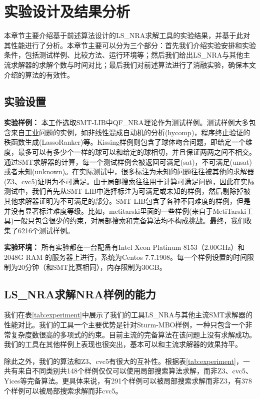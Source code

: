 \chapter{实验设计及结果分析}\label{chap:Result}

本章节主要介绍基于前述算法设计的LS\_NRA求解工具的实验结果，并基于此对其性能进行了分析。本章节主要可以分为三个部分：首先我们介绍实验安排和实验条件，包括测试样例、比较方法、运行环境等；然后我们给出LS\_NRA与其他主流求解器的求解个数与时间对比；最后我们对前述算法进行了消融实验，确保本文介绍的算法的有效性。

\section{实验设置}
\textbf{实验样例：} 本工作选取SMT-LIB中QF\_NRA理论作为测试样例。测试样例大多包含来自工业问题的实例，如非线性混成自动机的分析(hycomp)，程序终止验证的秩函数生成(LassoRanker)等。Kissing样例则包含了球体吻合问题，即给定一个维度，最多可以有多少个一样的球可以和给定的球相切，并且保证两两之间不相交。通过SMT求解器的计算，每一个测试样例会被返回可满足(sat)，不可满足(unsat)或者未知(unknown)。在实际测试中，很多标注为未知的问题往往被其他的求解器(Z3、cvc5)证明为不可满足。由于局部搜索往往用于计算可满足问题，因此在实际测试中，我们首先从SMT-LIB中选择标注为可满足或未知的样例，然后剔除掉被其他求解器证明为不可满足的部分。SMT-LIB包含了各种不同难度的样例，但是并没有显著标注难度等级。比如，metitarski里面的一些样例(来自于MetiTarski工具)一般只包含很少的约束，对局部搜索和完备算法均不构成挑战。最终，我们收集了6216个测试样例。


\textbf{实验环境：} 所有实验都在一台配备有Intel Xeon Platinum 8153（2.00GHz）和2048G RAM 的服务器上进行，系统为Centos 7.7.1908。每一个样例设置的时间限制为20分钟（和SMT比赛相同），内存限制为30GB。

\section{LS\_NRA求解NRA样例的能力}
我们在表\ref{tab:experiment}中展示了我们的工具LS\_NRA与其他主流SMT求解器的性能对比。我们的工具一个主要优势是针对Sturm-MBO样例，一种只包含一个非常复杂度数很高的多项式的约束。目前主流的完备算法在该问题上没有求解成功。我们的工具在其他样例上表现也很突出，基本可以和主流求解器的效果持平。

除此之外，我们的算法和Z3、cvc5有很大的互补性。根据表\ref{tab:experiment}，一共有来自不同类别共148个样例仅仅可以使用局部搜索算法求解，而非Z3、cvc5、Yices等完备算法。更具体来说，有291个样例可以被局部搜索求解而非Z3，有378个样例可以被局部搜索求解而非cvc5。




